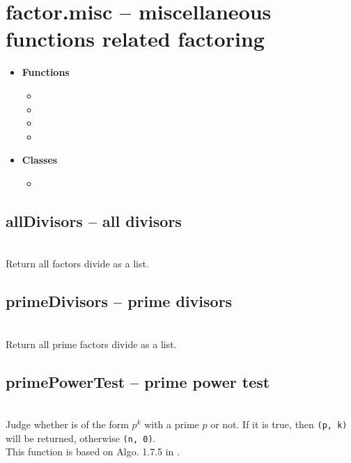 

 \section{factor.misc -- miscellaneous functions related factoring}
 \begin{itemize}
   \item {\bf Functions}
     \begin{itemize}
       \item {}
       \item {}
       \item {}
       \item {}
     \end{itemize}
   \item {\bf Classes}
   \begin{itemize}
     \item {}
   \end{itemize}
 \end{itemize}
%
  \subsection{allDivisors -- all divisors}
   \\
   \spacing
   \quad Return all factors divide  as a list.\\
%
  \subsection{primeDivisors -- prime divisors}
   \\
   \spacing
   \quad Return all prime factors divide  as a list.\\
%
  \subsection{primePowerTest -- prime power test}
   \\
   \spacing
   \quad Judge whether  is of the form \(p^k\) with a prime \(p\) or not.
   If it is true, then {\tt (p, k)} will be returned, otherwise {\tt (n, 0)}.\\
   \spacing
   \quad This function is based on Algo. 1.7.5 in \cite{Cohen1}.\\
%
